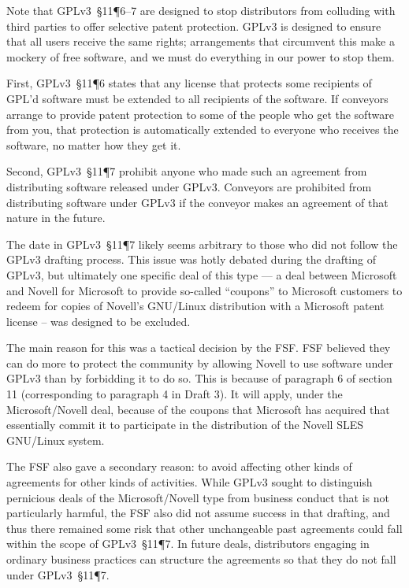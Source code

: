 Note that GPLv3~\S11\P6--7 are designed to stop distributors from colluding with
third parties to offer selective patent protection.  GPLv3 is designed to
ensure that all users receive the same rights; arrangements that circumvent
this make a mockery of free software, and we must do everything in our power
to stop them.

First, GPLv3~\S11\P6 states that any license that protects some recipients of
GPL'd software must be extended to all recipients of the software.  
If conveyors arrange to provide patent
protection to some of the people who get the software from you, that
protection is automatically extended to everyone who receives the software,
no matter how they get it. 

Second, GPLv3~\S11\P7
prohibit anyone who made such an agreement from distributing software
released under GPLv3.    Conveyors are prohibited from
distributing software under GPLv3 if the conveyor makes an agreement of that
nature in the future.

The date in GPLv3~\S11\P7 likely seems arbitrary to those who did not follow
the GPLv3 drafting process.  This issue was hotly debated during the drafting of
GPLv3, but ultimately one specific deal of this type --- a deal between Microsoft
and Novell for Microsoft to provide so-called ``coupons'' to Microsoft customers to redeem
for copies of Novell's GNU/Linux distribution with a Microsoft patent license -- was
designed to be excluded.

The main reason for this was a tactical decision by the FSF.  FSF believed they can do more to
protect the community by allowing Novell to use software under GPLv3
than by forbidding it to do so.  This is because of
paragraph 6 of section 11 (corresponding to paragraph 4 in Draft 3).
It will apply, under the Microsoft/Novell deal, because of the coupons
that Microsoft has acquired that essentially commit it to participate
in the distribution of the Novell SLES GNU/Linux system.

The FSF also gave a secondary reason:  to avoid affecting other kinds of agreements for
other kinds of activities.  While GPLv3 sought to 
distinguish pernicious deals of the Microsoft/Novell type from
business conduct that is not particularly harmful, the FSF also did not
assume success in that drafting, and thus there remained some risk that other
unchangeable past agreements could fall within the  scope of GPLv3~\S11\P7.
In future deals, distributors engaging in ordinary business practices
can structure the agreements so that they do not fall under GPLv3~\S11\P7.


